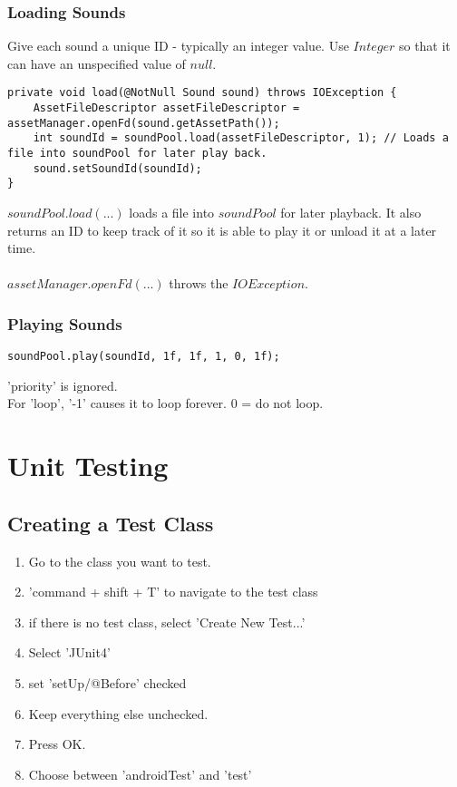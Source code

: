 \documentclass[]{article}
\begin{document}
\subsubsection{Loading Sounds}
Give each sound a unique ID - typically an integer value.  Use $Integer$ so that it can have an unspecified value of $null$.
\begin{lstlisting}
private void load(@NotNull Sound sound) throws IOException {
	AssetFileDescriptor assetFileDescriptor = assetManager.openFd(sound.getAssetPath());
	int soundId = soundPool.load(assetFileDescriptor, 1); // Loads a file into soundPool for later play back.
	sound.setSoundId(soundId);
}
\end{lstlisting}
$soundPool.load(...)$ loads a file into $soundPool$ for later playback.  It also returns an ID to keep track of it so it is able to play it or unload it at a later time.
\\\\
$assetManager.openFd(...)$ throws the $IOException$.

\subsubsection{Playing Sounds}
\begin{lstlisting}
soundPool.play(soundId, 1f, 1f, 1, 0, 1f);
\end{lstlisting}
'priority' is ignored.
\\
For 'loop', '-1' causes it to loop forever.  0 = do not loop.

\section{Unit Testing}
\subsection{Creating a Test Class}
\begin{enumerate}
	\item Go to the class you want to test.
	\item 'command + shift + T' to navigate to the test class
	\item if there is no test class, select 'Create New Test...'
	\item Select 'JUnit4'
	\item set 'setUp/@Before' checked
	\item Keep everything else unchecked.
	\item Press OK.
	\item Choose between 'androidTest' and 'test'
\end{enumerate}
\end{document}
